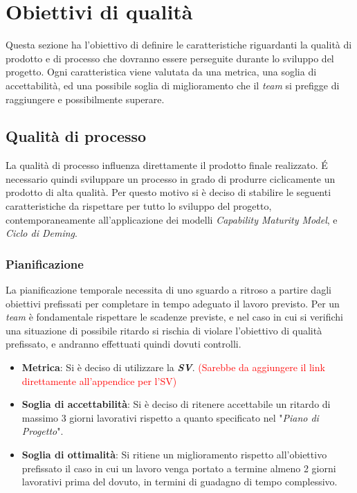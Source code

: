 \section{Obiettivi di qualità}
Questa sezione ha l'obiettivo di definire le caratteristiche riguardanti la qualità di prodotto e di processo che dovranno essere perseguite durante lo sviluppo del progetto.
Ogni caratteristica viene valutata da una metrica, una soglia di accettabilità, ed una possibile soglia di miglioramento che il \emph{team} si prefigge di raggiungere e possibilmente superare.
\subsection{Qualità di processo}
La qualità di processo influenza direttamente il prodotto finale realizzato. É necessario quindi sviluppare un processo in grado di produrre ciclicamente un prodotto di alta qualità. Per questo motivo si è deciso di stabilire le seguenti caratteristiche da rispettare per tutto lo sviluppo del progetto, contemporaneamente all'applicazione dei modelli \emph{Capability Maturity Model}, e \emph{Ciclo di Deming}.
\subsubsection{Pianificazione}
La pianificazione temporale necessita di uno sguardo a ritroso a partire dagli obiettivi prefissati per completare in tempo adeguato il lavoro previsto. Per un \emph{team} è fondamentale rispettare le scadenze previste, e nel caso in cui si verifichi una situazione di possibile ritardo si rischia di violare l'obiettivo di qualità prefissato, e andranno effettuati quindi dovuti controlli.
\begin{itemize}
	\item \textbf{Metrica}: Si è deciso di utilizzare la \emph{\textbf{SV}}. \textcolor{red}{(Sarebbe da aggiungere il link direttamente all'appendice per l'SV)}
	\item \textbf{Soglia di accettabilità}: Si è deciso di ritenere accettabile un ritardo di massimo 3 giorni lavorativi rispetto a quanto specificato nel "\emph{Piano di Progetto}".
	\item \textbf{Soglia di ottimalità}: Si ritiene un miglioramento rispetto all'obiettivo prefissato il caso in cui un lavoro venga portato a termine almeno 2 giorni lavorativi prima del dovuto, in termini di guadagno di tempo complessivo.
\end{itemize}
